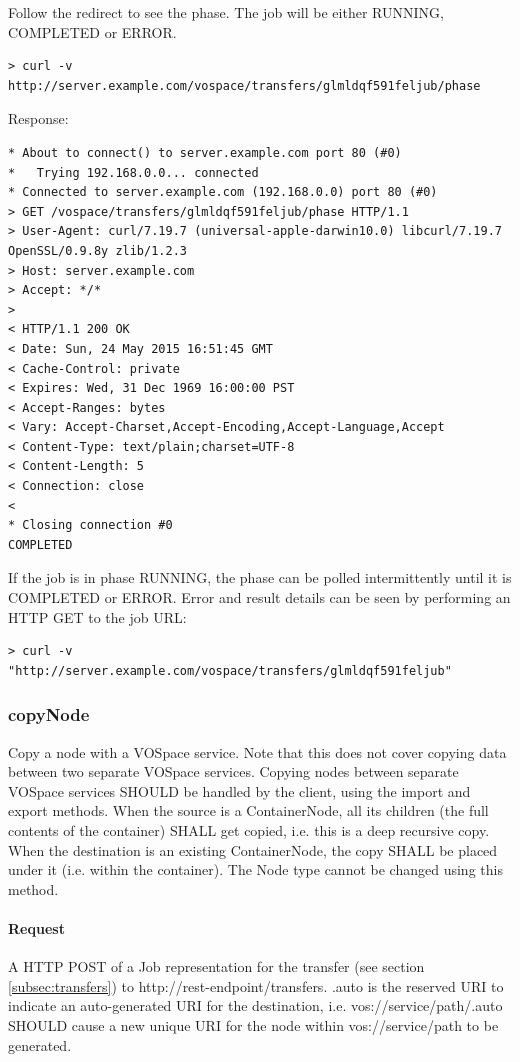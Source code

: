 \documentclass[11pt,a4paper]{ivoa}
\begin{document}
Follow the redirect to see the phase.  The job will be either RUNNING, COMPLETED or ERROR.
\begin{lstlisting}
> curl -v http://server.example.com/vospace/transfers/glmldqf591feljub/phase
\end{lstlisting}
Response:
\begin{lstlisting}
* About to connect() to server.example.com port 80 (#0)
*   Trying 192.168.0.0... connected
* Connected to server.example.com (192.168.0.0) port 80 (#0)
> GET /vospace/transfers/glmldqf591feljub/phase HTTP/1.1
> User-Agent: curl/7.19.7 (universal-apple-darwin10.0) libcurl/7.19.7 OpenSSL/0.9.8y zlib/1.2.3
> Host: server.example.com
> Accept: */*
>
< HTTP/1.1 200 OK
< Date: Sun, 24 May 2015 16:51:45 GMT
< Cache-Control: private
< Expires: Wed, 31 Dec 1969 16:00:00 PST
< Accept-Ranges: bytes
< Vary: Accept-Charset,Accept-Encoding,Accept-Language,Accept
< Content-Type: text/plain;charset=UTF-8
< Content-Length: 5
< Connection: close
<
* Closing connection #0
COMPLETED
\end{lstlisting}
If the job is in phase RUNNING, the phase can be polled intermittently until it is COMPLETED or ERROR.
Error and result details can be seen by performing an HTTP GET to the job URL:
\begin{lstlisting}
> curl -v "http://server.example.com/vospace/transfers/glmldqf591feljub"
\end{lstlisting}

\subsubsection{copyNode}
\label{subsubsec:copynode}
Copy a node with a VOSpace service.
Note that this does not cover copying data between two separate VOSpace services.
Copying nodes between separate VOSpace services SHOULD be handled by the client, using the import and export methods.
When the source is a ContainerNode, all its children (the full contents of the container) SHALL get copied, i.e. this is a deep recursive copy.
When the destination is an existing ContainerNode, the copy SHALL be placed under it (i.e. within the container).
The Node type cannot be changed using this method.

\paragraph{Request}
A HTTP POST of a Job representation for the transfer (see section \ref{subsec:transfers}) to http://rest-endpoint/transfers.
.auto is the reserved URI to indicate an auto-generated URI for the destination, i.e. vos://service/path/.auto SHOULD cause a new unique URI for the node within vos://service/path to be generated.
\end{document}
